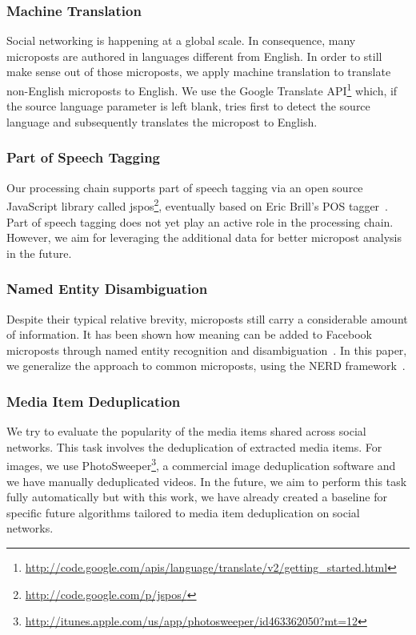 \subsubsection{Machine Translation}
Social networking is happening at a global scale. In consequence, many microposts are authored in languages different from English. In order to still make sense out of those microposts, we apply machine translation to translate non-English microposts to English. We use the Google Translate API\footnote{\url{http://code.google.com/apis/language/translate/v2/getting_started.html}} which, if the source language parameter is left blank, tries first to detect the source language and subsequently translates the micropost to English.

\subsubsection{Part of Speech Tagging}
Our processing chain supports part of speech tagging via an open source JavaScript library called jspos\footnote{\url{http://code.google.com/p/jspos/}},
eventually based on Eric Brill's POS tagger~\cite{brill1992simple}. Part of speech tagging does not yet play an active role in the processing chain. However,
we aim for leveraging the additional data for better micropost analysis in the future.

\subsubsection{Named Entity Disambiguation}
Despite their typical relative brevity, microposts still carry a considerable amount of information. It has been shown how meaning can be added to Facebook microposts through named entity recognition and disambiguation~\cite{AddingMeaningToMicroposts}. In this paper, we generalize the approach to common microposts,
using the NERD framework~\cite{NERD}.

\subsubsection{Media Item Deduplication}
We try to evaluate the popularity of the media items shared across social networks. This task involves the deduplication of extracted media items.
For images, we use PhotoSweeper\footnote{\url{http://itunes.apple.com/us/app/photosweeper/id463362050?mt=12}}, a commercial image deduplication software and we have manually deduplicated videos. In the future, we aim to perform this task fully automatically but with this work, we have already created a baseline for specific future algorithms tailored to media item deduplication on social networks.

